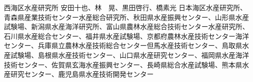 {西海区水産研究所}
{安田十也、林　晃、黒田啓行、橋素光}
{日本海区水産研究所、青森県産業技術センター水産総合研究所、秋田県水産振興センター、山形県水産試験場、新潟県水産海洋研究所、富山県農林水産総合技術センター水産研究所、石川県水産総合センター、福井県水産試験場、京都府農林水産技術センター海洋センター、兵庫県立農林水産技術総合センター但馬水産技術センター、鳥取県水産試験場、島根県水産技術センター、山口県水産研究センター、福岡県水産海洋技術センター、佐賀県玄海水産振興センター、長崎県総合水産試験場、熊本県水産研究センター、鹿児島県水産技術開発センター}
